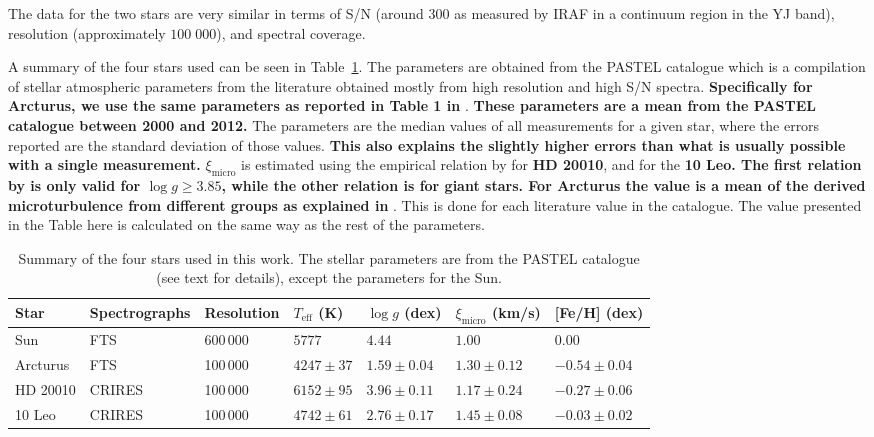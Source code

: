 \documentclass{aa}
\begin{document}
The data for the two stars are very similar in terms of S/N (around 300 as
measured by IRAF in a continuum region in the YJ band), resolution
(approximately $100\;000$), and spectral coverage.

A summary of the four stars used can be seen in Table~\ref{tab:stars}. The parameters are obtained
from the PASTEL catalogue \citep{Soubiran2016} which is a compilation of stellar atmospheric
parameters from the literature obtained mostly from high resolution and high S/N spectra. {\bf
Specifically for Arcturus, we use the same parameters as reported in Table 1 in} \citet{Jofre2014}.
{\bf These parameters are a mean from the PASTEL catalogue between 2000 and 2012.} The parameters
are the median values of all measurements for a given star, where the errors reported are the
standard deviation of those values. {\bf This also explains the slightly higher errors than what is
usually possible with a single measurement.} $\xi_\mathrm{micro}$ is estimated using the empirical
relation by \citet{Tsantaki2013} for {\bf HD 20010}, and \citet{Adibekyan2015} for the {\bf 10 Leo.
The first relation by \citet{Tsantaki2013} is only valid for $\log g\ge3.85$, while the other
relation is for giant stars. For Arcturus the value is a mean of the derived microturbulence from
different groups as explained in} \citet{Jofre2014}. This is done for each literature value in the
catalogue. The value presented in the Table here is calculated on the same way as the rest of the
parameters.

\begin{table}[htb!]
    \caption{Summary of the four stars used in this work. The stellar parameters
             are from the PASTEL catalogue \citep{Soubiran2016} (see text for
             details), except the parameters for the Sun.}
    \label{tab:stars}
    \centering
    \begin{tabular}{lllllll}
      \hline\hline
        Star        & Spectrographs  & Resolution  & $T_\mathrm{eff}$ (K) &  $\log g$ (dex)  &   $\xi_\mathrm{micro}$ (km/s)   & [Fe/H] (dex)      \\
      \hline
        Sun         & FTS            & 600\,000    & $5777$               &  $4.44$          &    $1.00$                       & $ 0.00$          \\
        Arcturus    & FTS            & 100\,000    & $4247 \pm  37$       &  $1.59 \pm 0.04$ &    $1.30 \pm 0.12$              & $-0.54 \pm 0.04$ \\
        HD 20010    & CRIRES         & 100\,000    & $6152 \pm  95$       &  $3.96 \pm 0.11$ &    $1.17 \pm 0.24$              & $-0.27 \pm 0.06$ \\
        10 Leo      & CRIRES         & 100\,000    & $4742 \pm  61$       &  $2.76 \pm 0.17$ &    $1.45 \pm 0.08$              & $-0.03 \pm 0.02$ \\
      \hline
    \end{tabular}
\end{table}
\end{document}
